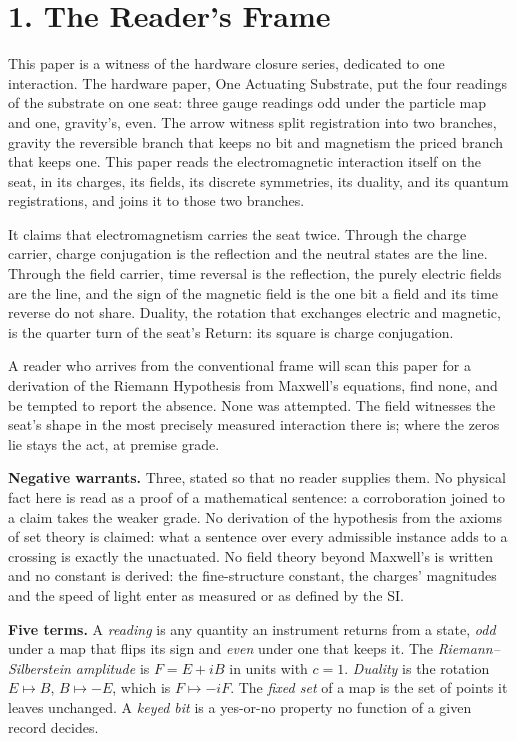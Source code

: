 \documentclass[10pt]{article}
\begin{document}
\hypertarget{the-readers-frame}{%
\section{1. The Reader's Frame}\label{the-readers-frame}}

This paper is a witness of the hardware closure series, dedicated to one
interaction. The hardware paper, One Actuating Substrate, put the four
readings of the substrate on one seat: three gauge readings odd under
the particle map and one, gravity's, even. The arrow witness split
registration into two branches, gravity the reversible branch that keeps
no bit and magnetism the priced branch that keeps one. This paper reads
the electromagnetic interaction itself on the seat, in its charges, its
fields, its discrete symmetries, its duality, and its quantum
registrations, and joins it to those two branches.

It claims that electromagnetism carries the seat twice. Through the
charge carrier, charge conjugation is the reflection and the neutral
states are the line. Through the field carrier, time reversal is the
reflection, the purely electric fields are the line, and the sign of the
magnetic field is the one bit a field and its time reverse do not share.
Duality, the rotation that exchanges electric and magnetic, is the
quarter turn of the seat's Return: its square is charge conjugation.

A reader who arrives from the conventional frame will scan this paper
for a derivation of the Riemann Hypothesis from Maxwell's equations,
find none, and be tempted to report the absence. None was attempted. The
field witnesses the seat's shape in the most precisely measured
interaction there is; where the zeros lie stays the act, at premise
grade.

\textbf{Negative warrants.} Three, stated so that no reader supplies
them. No physical fact here is read as a proof of a mathematical
sentence: a corroboration joined to a claim takes the weaker grade. No
derivation of the hypothesis from the axioms of set theory is claimed:
what a sentence over every admissible instance adds to a crossing is
exactly the unactuated. No field theory beyond Maxwell's is written and
no constant is derived: the fine-structure constant, the charges'
magnitudes and the speed of light enter as measured or as defined by the
SI.

\textbf{Five terms.} A \emph{reading} is any quantity an instrument
returns from a state, \emph{odd} under a map that flips its sign and
\emph{even} under one that keeps it. The \emph{Riemann--Silberstein
amplitude} is \(F=E+iB\) in units with \(c=1\). \emph{Duality} is the
rotation \(E\mapsto B\), \(B\mapsto -E\), which is \(F\mapsto -iF\). The
\emph{fixed set} of a map is the set of points it leaves unchanged. A
\emph{keyed bit} is a yes-or-no property no function of a given record
decides.
\end{document}
